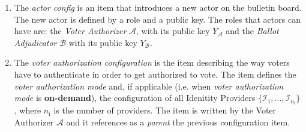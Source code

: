 \begin{enumerate}
    \item The \textit{actor config} is an item that introduces a new actor on the bulletin board. The new actor is defined by a role and a public key. The roles that actors can have are: the \textit{Voter Authorizer} $\mathcal{A}$, with its public key $Y_\mathcal{A}$ and the \textit{Ballot Adjudicator} $\mathcal{B}$ with its public key $Y_\mathcal{B}$.

    \item The \textit{voter authorization configuration} is the item describing the way voters have to authenticate in order to get authorized to vote. The item defines the \textit{voter authorization mode} and, if applicable (i.e. when \textit{voter authorization mode} is \textbf{on-demand}), the configuration of all Idenitity Providers $\{\mathcal{I}_1, ..., \mathcal{I}_{n_\mathrm{i}}\}$, where $n_\mathrm{i}$ is the number of providers. The item is written by the Voter Authorizer $\mathcal{A}$ and it references as a \textit{parent} the previous configuration item.
\end{enumerate}


